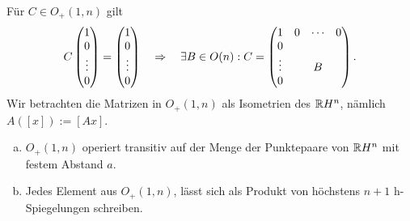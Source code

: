 \begin{rmrk*}
Für $C \in O_+(1,n)$ gilt
\[ C \begin{pmatrix}1 \\ 0 \\ \vdots \\ 0\end{pmatrix} = \begin{pmatrix}1 \\ 0 \\ \vdots \\ 0\end{pmatrix} \quad \Rightarrow \quad \exists B
  \in O(n) : C =
  \begin{pmatrix}
    1 & 0 & \cdots & 0 \\
    0 \\
    \vdots & & B \\
    0 
  \end{pmatrix}. \]
Wir betrachten die Matrizen in $O_+(1,n)$ als Isometrien des $\mathbb{R} H^n$,
nämlich $A([x]) := [Ax]$.
\end{rmrk*}

\begin{thm}
  \begin{enumerate}[a)]
  \item $O_+(1,n)$ operiert transitiv auf der Menge der Punktepaare von $\mathbb{R}
    H^n$ mit festem Abstand $a$.
  \item Jedes Element aus $O_+(1,n)$, lässt sich als Produkt von höchstens $n+1$
    h-Spiegelungen schreiben.
  \end{enumerate}
\end{thm}

